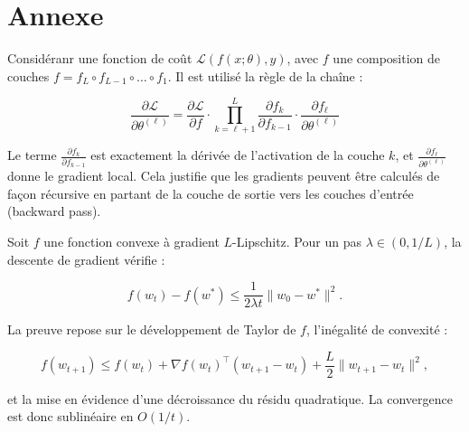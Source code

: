 \appendix
\pagestyle{plain} %
\chapter*{Annexe}
\label{sec-annexe}

\begin{preuve}

Considéranr une fonction de coût \( \mathcal{L}(f(x;\theta), y) \), avec \( f \) une composition de couches \( f = f_L \circ f_{L-1} \circ \dots \circ f_1 \). Il est utilisé la règle de la chaîne :

\[
\frac{\partial \mathcal{L}}{\partial \theta^{(\ell)}} = \frac{\partial \mathcal{L}}{\partial f} \cdot \prod_{k=\ell+1}^{L} \frac{\partial f_k}{\partial f_{k-1}} \cdot \frac{\partial f_\ell}{\partial \theta^{(\ell)}}
\]

Le terme \( \displaystyle \frac{\partial f_k}{\partial f_{k-1}} \) est exactement la dérivée de l’activation de la couche \( k \), et \( \displaystyle \frac{\partial f_\ell}{\partial \theta^{(\ell)}} \) donne le gradient local. Cela justifie que les gradients peuvent être calculés de façon récursive en partant de la couche de sortie vers les couches d’entrée (backward pass).
\end{preuve}


\begin{preuve}

Soit \( f \) une fonction convexe à gradient \( L \)-Lipschitz. Pour un pas \( \lambda \in (0, 1/L) \), la descente de gradient vérifie :

\[
f(w_t) - f(w^*) \leq \frac{1}{2\lambda t} \|w_0 - w^*\|^2.
\]

La preuve repose sur le développement de Taylor de \( f \), l’inégalité de convexité :

\[
f(w_{t+1}) \leq f(w_t) + \nabla f(w_t)^\top (w_{t+1} - w_t) + \frac{L}{2} \|w_{t+1} - w_t\|^2,
\]

et la mise en évidence d’une décroissance du résidu quadratique. La convergence est donc sublinéaire en \( O(1/t) \).
\end{preuve}


